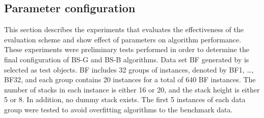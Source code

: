 \documentclass[review,3p,times,authoryear,12pt]{elsarticle}
\begin{document}
%
%
%

\subsection {Parameter configuration}
\label{sub:config}

This section describes the experiments that evaluates the effectiveness of the evaluation scheme and show effect of parameters on algorithm performance.
These experiments were preliminary tests performed in order to determine the final configuration of BS-G and BS-B algorithms. Data set BF generated by \cite{BF2012} is selected as test objects. BF includes 32 groups of instances, denoted by BF1, \dots, BF32, and each group contains 20 instances for a total of 640 BF instances.
The number of stacks in each instance is either 16 or 20, and the stack height is either 5 or 8.
In addition, no dummy stack exists.
The first 5 instances of each data group were tested to avoid overfitting algorithms to the benchmark data.
\end{document}
